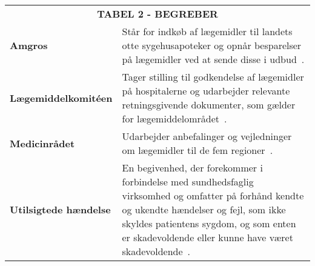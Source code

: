 \begin{table}[H]
\label{table:begreber}
\begin{tabular}{p{4.5cm} p{9.8cm}}
\multicolumn{2}{c}{\cellcolor[HTML]{C0C0C0}\textbf{TABEL 2 - BEGREBER}} \vspace{0.2cm}\\
\textbf{Amgros} & Står for indkøb af lægemidler til landets otte sygehusapoteker og opnår besparelser på lægemidler ved at sende disse i udbud~\citep{Amgros2018b}. \vspace{0.2cm} \\
\textbf{Lægemiddelkomitéen} & Tager stilling til godkendelse af lægemidler på hospitalerne og udarbejder relevante retningsgivende dokumenter, som gælder for lægemiddelområdet~\citep{RegionNordjylland2018}. \vspace{0.2cm} \\
\textbf{Medicinrådet} & Udarbejder anbefalinger og vejledninger om lægemidler til de fem regioner~\citep{Medicinradet2018}.\vspace{0.2cm} \\
\textbf{Utilsigtede hændelse} & En begivenhed, der forekommer i forbindelse med sundhedsfaglig virksomhed og omfatter på forhånd kendte og ukendte hændelser og fejl, som ikke skyldes patientens sygdom, og som enten er skadevoldende eller kunne have været skadevoldende~\citep{RegionMidtjylland2016}.
\vspace{0.5cm} \\

\end{tabular}
\end{table}
